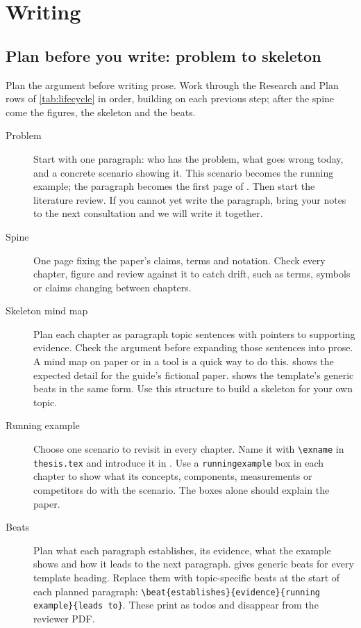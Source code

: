 \chapter{Writing}\label{app:writing}
\section{Plan before you write: problem to skeleton}\label{app:writing:spine}
Plan the argument before writing prose. Work through the Research and Plan rows of \cref{tab:lifecycle} in order, building on each previous step; after the spine come the figures, the skeleton and the beats.
\begin{description}
  \item[Problem] Start with one paragraph: who has the problem, what goes wrong today, and a concrete scenario showing it. This scenario becomes the running example; the paragraph becomes the first page of . Then start the literature review. If you cannot yet write the paragraph, bring your notes to the next consultation and we will write it together.
  \item[Spine] One page fixing the paper's claims, terms and notation. Check every chapter, figure and review against it to catch drift, such as terms, symbols or claims changing between chapters.
  \item[Skeleton mind map] Plan each chapter as paragraph topic sentences with pointers to supporting evidence. Check the argument before expanding those sentences into prose. A mind map on paper or in a tool is a quick way to do this.  shows the expected detail for the guide's fictional paper.  shows the template's generic beats in the same form. Use this structure to build a skeleton for your own topic.
  \item[Running example] Choose one scenario to revisit in every chapter. Name it with \texttt{\textbackslash exname} in \texttt{thesis.tex} and introduce it in . Use a \texttt{runningexample} box in each chapter to show what its concepts, components, measurements or competitors do with the scenario. The boxes alone should explain the paper.
  \item[Beats] Plan what each paragraph establishes, its evidence, what the example shows and how it leads to the next paragraph.  gives generic beats for every template heading. Replace them with topic-specific beats at the start of each planned paragraph: \texttt{\textbackslash beat\{establishes\}\{evidence\}\{running example\}\{leads to\}}. These print as todos and disappear from the reviewer PDF.
\end{description}

